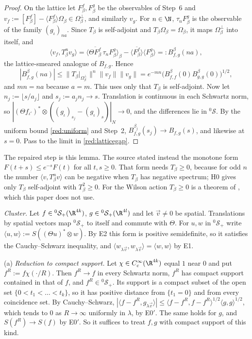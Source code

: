 \begin{proof}
On the lattice let $F^f_\beta,F^g_\beta$ be the observables of Step~6 and $v_f:=[F^f_\beta]-\langle F^f_\beta\rangle\Omega_\beta\in\Omega_\beta^\perp$, and similarly $v_g$. For $n\in\N$, $\tau_nF^g_\beta$ is the observable of the family $(g_\iota)_{na}$. Since $T_\beta$ is self-adjoint and $T_\beta\Omega_\beta=\Omega_\beta$, it maps $\Omega_\beta^\perp$ into itself, and
\[
  \langle v_f,T_\beta^nv_g\rangle=\langle\overline{\Theta F^f_\beta}\,\tau_nF^g_\beta\rangle_\beta-\overline{\langle F^f_\beta\rangle}\langle F^g_\beta\rangle=:B^\beta_{f,g}(na),
\]
the lattice-smeared analogue of $B_{f,g}$. Hence
\begin{equation}\label{red:latticegap}
  |B^\beta_{f,g}(na)|\le\|T_\beta|_{\Omega_\beta^\perp}\|^n\|v_f\|\|v_g\|=e^{-mn}\bigl(B^\beta_{f,f}(0)B^\beta_{g,g}(0)\bigr)^{1/2},
\end{equation}
and $mn=na$ because $a=m$. This uses only that $T_\beta$ is self-adjoint. Now let $n_j:=\lfloor s/a_j\rfloor$ and $s_j:=a_jn_j\to s$. Translation is continuous in each Schwartz norm, so $|(\Theta f_{\iota'})^*\otimes((g_\iota)_{s_j}-(g_\iota)_s)|_{N}\to0$, and the differences lie in ${}^0\mathcal S$. By the uniform bound \eqref{red:uniform} and Step~2, $B^{\beta_j}_{f,g}(s_j)\to B_{f,g}(s)$, and likewise at $s=0$. Pass to the limit in \eqref{red:latticegap}.
\end{proof}

The repaired step is this lemma. The source stated instead the monotone form $F(t+s)\le e^{-s}F(t)$ for all $t,s\ge0$. That form needs $T_\beta\ge0$, because for odd $n$ the number $\langle v,T_\beta^nv\rangle$ can be negative when $T_\beta$ has negative spectrum; H0 gives only $T_\beta$ self-adjoint with $T_\beta^2\ge0$. For the Wilson action $T_\beta\ge0$ is a theorem of \cite{Lu77}, which this paper does not use.

\emph{Cluster.} Let $f\in{}^0\mathcal S_+(\R^{4k})$, $g\in{}^0\mathcal S_+(\R^{4l})$ and let $\vec v\ne0$ be spatial. Translations by spatial vectors map ${}^0\mathcal S_+$ to itself and commute with $\Theta$. For $u,w$ in ${}^0\mathcal S_+$ write $\langle u,w\rangle:=S((\Theta u)^*\otimes w)$. By E2 this form is positive semidefinite, so it satisfies the Cauchy--Schwarz inequality, and $\langle w_{\lambda\vec v},w_{\lambda\vec v}\rangle=\langle w,w\rangle$ by E1.

(a) \emph{Reduction to compact support.} Let $\chi\in C_c^\infty(\R^{4k})$ equal $1$ near $0$ and put $f^R:=f\chi(\cdot/R)$. Then $f^R\to f$ in every Schwartz norm, $f^R$ has compact support contained in that of $f$, and $f^R\in{}^0\mathcal S_+$. Its support is a compact subset of the open set $\{0<t_1<\dots<t_k\}$, so it has positive distance from $\{t_1=0\}$ and from every coincidence set. By Cauchy--Schwarz, $|\langle f-f^R,g_{\lambda\vec v}\rangle|\le\langle f-f^R,f-f^R\rangle^{1/2}\langle g,g\rangle^{1/2}$, which tends to $0$ as $R\to\infty$ uniformly in $\lambda$, by E0$'$. The same holds for $g$, and $S(f^R)\to S(f)$ by E0$'$. So it suffices to treat $f,g$ with compact support of this kind.

